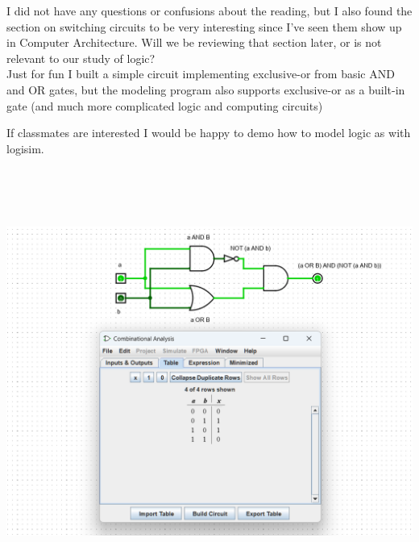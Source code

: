 \documentclass[english, 11pt]{amsart}
\begin{document}
\setlength{\headheight}{13.0pt}
\setlength{\footskip}{15.0pt}




I did not have any questions or confusions about the reading,
but I also found the section on switching circuits to be very interesting
since I've seen them show up in Computer Architecture.
Will we be reviewing that section later, or is
not relevant to our study of logic?
\\
Just for fun I built a simple circuit implementing exclusive-or
from basic AND and OR gates, but the modeling program also supports
exclusive-or as a built-in gate (and much more complicated logic and computing circuits)

If classmates are interested I would be happy to demo
how to model logic as with logisim.

\includegraphics*[height=14cm,keepaspectratio]{xor.png}
\end{document}
